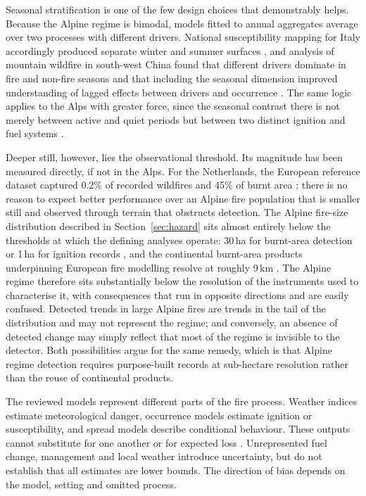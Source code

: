\documentclass[11pt,a4paper]{article}
\begin{document}
Seasonal stratification is one of the few design choices that demonstrably helps. Because the Alpine regime is bimodal, models fitted to annual aggregates average over two processes with different drivers. National susceptibility mapping for Italy accordingly produced separate winter and summer surfaces \citep{trucchia_defining_2022}, and analysis of mountain wildfire in south-west China found that different drivers dominate in fire and non-fire seasons and that including the seasonal dimension improved understanding of lagged effects between drivers and occurrence \citep{wang_seasonal_2023}. The same logic applies to the Alps with greater force, since the seasonal contrast there is not merely between active and quiet periods but between two distinct ignition and fuel systems \citep{muller_forest_2020, bercak_combination_2024}.

Deeper still, however, lies the observational threshold. Its magnitude has been measured directly, if not in the Alps. For the Netherlands, the European reference dataset captured 0.2\% of recorded wildfires and 45\% of burnt area \citep{stoof_temperate_2024}; there is no reason to expect better performance over an Alpine fire population that is smaller still and observed through terrain that obstructs detection. The Alpine fire-size distribution described in Section~\ref{sec:hazard} sits almost entirely below the thresholds at which the defining analyses operate: 30\,ha for burnt-area detection \citep{beloiu_climatedriven_2026} or 1\,ha for ignition records \citep{gelabert_assessing_2025}, and the continental burnt-area products underpinning European fire modelling resolve at roughly 9\,km \citep{forrest_understanding_2024}. The Alpine regime therefore sits substantially below the resolution of the instruments used to characterise it, with consequences that run in opposite directions and are easily confused. Detected trends in large Alpine fires are trends in the tail of the distribution and may not represent the regime; and conversely, an absence of detected change may simply reflect that most of the regime is invisible to the detector. Both possibilities argue for the same remedy, which is that Alpine regime detection requires purpose-built records at sub-hectare resolution rather than the reuse of continental products.

The reviewed models represent different parts of the fire process. Weather indices estimate meteorological danger, occurrence models estimate ignition or susceptibility, and spread models describe conditional behaviour. These outputs cannot substitute for one another or for expected loss \citep{muller_towards_2020, trucchia_defining_2022, malanchini_modeling_2025}. Unrepresented fuel change, management and local weather introduce uncertainty, but do not establish that all estimates are lower bounds. The direction of bias depends on the model, setting and omitted process.
\end{document}
